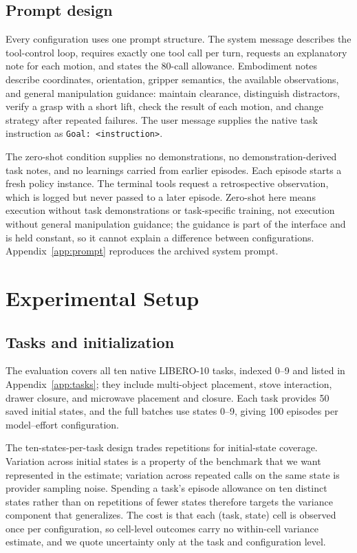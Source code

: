 \documentclass[11pt]{article}
\begin{document}
\subsection{Prompt design}
Every configuration uses one prompt structure. The system message describes the
tool-control loop, requires exactly one tool call per turn, requests an
explanatory note for each motion, and states the 80-call allowance. Embodiment
notes describe coordinates, orientation, gripper semantics, the available
observations, and general manipulation guidance: maintain clearance,
distinguish distractors, verify a grasp with a short lift, check the result of
each motion, and change strategy after repeated failures. The user message
supplies the native task instruction as \texttt{Goal: <instruction>}.

The zero-shot condition supplies no demonstrations, no demonstration-derived
task notes, and no learnings carried from earlier episodes. Each episode starts
a fresh policy instance. The terminal tools request a retrospective
observation, which is logged but never passed to a later episode. Zero-shot
here means execution without task demonstrations or task-specific training, not
execution without general manipulation guidance; the guidance is part of the
interface and is held constant, so it cannot explain a difference between
configurations. Appendix~\ref{app:prompt} reproduces the archived system
prompt.

\section{Experimental Setup}
\label{sec:experiments}

\subsection{Tasks and initialization}
The evaluation covers all ten native LIBERO-10 tasks, indexed 0--9 and listed
in Appendix~\ref{app:tasks}; they include multi-object placement, stove
interaction, drawer closure, and microwave placement and closure. Each task
provides 50 saved initial states, and the full batches use states 0--9, giving
100 episodes per model--effort configuration.

The ten-states-per-task design trades repetitions for initial-state coverage.
Variation across initial states is a property of the benchmark that we want
represented in the estimate; variation across repeated calls on the same state
is provider sampling noise. Spending a task's episode allowance on ten distinct
states rather than on repetitions of fewer states therefore targets the
variance component that generalizes. The cost is that each (task, state) cell
is observed once per configuration, so cell-level outcomes carry no
within-cell variance estimate, and we quote uncertainty only at the task and
configuration level.
\end{document}
